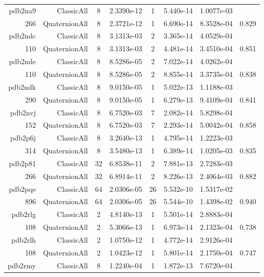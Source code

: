 \begin{xltabular}{\textwidth}{r|rcS[table-format=1.4e+2]cS[table-format=1.3e+2]S[table-format=1.4e+2]S[table-format=-1.3]}
pdb2na9 & ClassicAll & 8 & 2.3390e-12 & 1 & 5.440e-14 & 1.0077e-03 & \\
266 & QuaternionAll & 8 & 2.3721e-12 & 1 & 6.690e-14 & 8.3528e-04 & 0.829\\  \addlinespace
pdb2ndc & ClassicAll & 8 & 3.1313e-03 & 2 & 3.365e-14 & 4.0529e-04 & \\
110 & QuaternionAll & 8 & 3.1313e-03 & 2 & 4.481e-14 & 3.4510e-04 & 0.851\\  \addlinespace
pdb2nde & ClassicAll & 8 & 8.5286e-05 & 2 & 7.022e-14 & 4.0262e-04 & \\
110 & QuaternionAll & 8 & 8.5286e-05 & 2 & 8.855e-14 & 3.3735e-04 & 0.838\\  \addlinespace
pdb2ndk & ClassicAll & 8 & 9.0150e-05 & 1 & 5.022e-13 & 1.1188e-03 & \\
290 & QuaternionAll & 8 & 9.0150e-05 & 1 & 6.279e-13 & 9.4109e-04 & 0.841\\  \addlinespace
pdb2nvj & ClassicAll & 8 & 6.7520e-03 & 7 & 2.082e-14 & 5.8298e-04 & \\
152 & QuaternionAll & 8 & 6.7520e-03 & 7 & 2.293e-14 & 5.0042e-04 & 0.858\\  \addlinespace
pdb2p6j & ClassicAll & 8 & 3.2640e-13 & 1 & 4.795e-14 & 1.2223e-03 & \\
314 & QuaternionAll & 8 & 3.5480e-13 & 1 & 6.389e-14 & 1.0205e-03 & 0.835\\  \addlinespace
pdb2p81 & ClassicAll & 32 & 6.8538e-11 & 2 & 7.881e-13 & 2.7283e-03 & \\
266 & QuaternionAll & 32 & 6.8914e-11 & 2 & 8.226e-13 & 2.4064e-03 & 0.882\\  \addlinespace
pdb2pqe & ClassicAll & 64 & 2.0306e-05 & 26 & 5.532e-10 & 1.5317e-02 & \\
896 & QuaternionAll & 64 & 2.0306e-05 & 26 & 5.544e-10 & 1.4398e-02 & 0.940\\  \addlinespace
pdb2rlg & ClassicAll & 2 & 4.8140e-13 & 1 & 5.501e-14 & 2.8883e-04 & \\
108 & QuaternionAll & 2 & 5.3066e-13 & 1 & 6.973e-14 & 2.1323e-04 & 0.738\\  \addlinespace
pdb2rlh & ClassicAll & 2 & 1.0750e-12 & 1 & 4.772e-14 & 2.9126e-04 & \\
108 & QuaternionAll & 2 & 1.0423e-12 & 1 & 5.801e-14 & 2.1750e-04 & 0.747\\  \addlinespace
pdb2rmy & ClassicAll & 8 & 1.2240e-04 & 1 & 1.872e-13 & 7.6720e-04 & \\

\end{xltabular}
